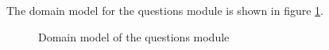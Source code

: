 The domain model for the questions module is shown in figure \ref{fig:questions _domainModel}.

\begin{figure}[htb]
\begin{center}
\end{center}
\caption{ Domain model of the questions module \label{fig:questions _domainModel}}
\end{figure}
